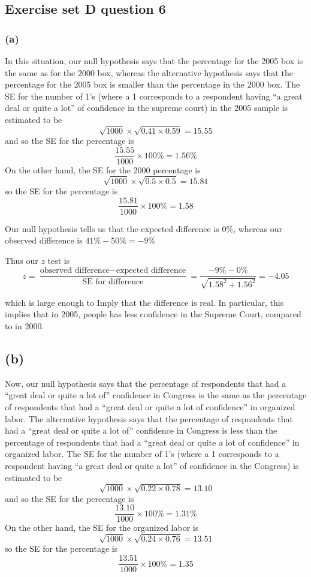 \documentclass[11pt]{article}
\begin{document}
\subsection*{Exercise set D question 6} %
\subsubsection*{(a)}
\noindent In this situation, our null hypothesis says that the percentage for the 2005 box is the same as for the 2000 box, whereas the alternative hypothesis says that the percentage for the 2005 box is smaller than the percentage in the 2000 box. The SE for the number of 1's (where a 1 corresponds to a respondent having ``a great deal or quite a lot'' of confidence in the supreme court) in the 2005 sample is estimated to be
$$\sqrt{1000} \times \sqrt{0.41 \times 0.59} = 15.55$$
\noindent and so the SE for the percentage is
$$\frac{15.55}{1000} \times 100\% = 1.56\%$$
\noindent On the other hand, the SE for the 2000 percentage is
$$\sqrt{1000} \times \sqrt{0.5 \times 0.5} = 15.81$$
\noindent so the SE for the percentage is
$$\frac{15.81}{1000} \times 100\% = 1.58$$

\noindent Our null hypothesis tells us that the expected difference is $0\%$, whereas our observed difference is $41\% - 50\% = -9\%$

\noindent Thus our $z$ test is
$$z = \frac{\text{observed difference} - \text{expected difference}}{\text{SE for difference}} = \frac{ - 9\% - 0\%}{\sqrt{1.58^2 + 1.56^2}} = -4.05$$

\noindent which is large enough to Imply that the difference is real. In particular, this implies that in 2005, people has less confidence in the Supreme Court, compared to in 2000.


\subsection*{(b)}
\noindent Now, our null hypothesis says that the percentage of respondents that had a ``great deal or quite a lot of''  confidence in Congress is the same as the percentage of respondents that had a ``great deal or quite a lot of confidence'' in organized labor. The alternative hypothesis says that the percentage of respondents that had a ``great deal or quite a lot of''  confidence in Congress is less than the percentage of respondents that had a ``great deal or quite a lot of confidence'' in organized labor. The SE for the number of 1's (where a 1 corresponds to a respondent having ``a great deal or quite a lot'' of confidence in the Congress) is estimated to be
$$\sqrt{1000} \times \sqrt{0.22 \times 0.78} = 13.10$$
\noindent and so the SE for the percentage is
$$\frac{13.10}{1000} \times 100\% = 1.31\%$$
\noindent On the other hand, the SE for the organized labor is
$$\sqrt{1000} \times \sqrt{0.24 \times 0.76} = 13.51$$
\noindent so the SE for the percentage is
$$\frac{13.51}{1000} \times 100\% = 1.35$$
\end{document}
